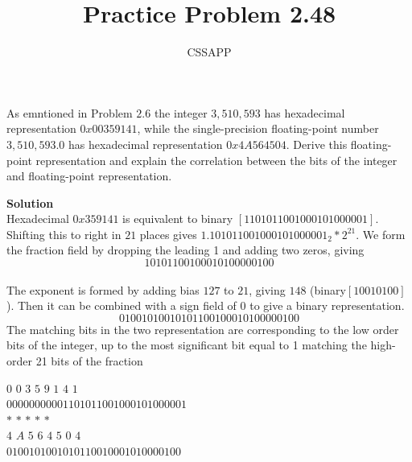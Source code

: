 \documentclass{article}
\title{Practice Problem 2.48}
\author{CSSAPP}
\begin{document}
    \maketitle
    \begin{flushleft}
        As emntioned in Problem $2.6$ the integer $3,510,593$ has hexadecimal representation 
        $0x00 359141$, while the single-precision floating-point number $3,510,593.0$ has 
        hexadecimal representation $0x4A564504$. Derive this floating-point representation
        and explain the correlation between the bits of the integer and floating-point representation.

        \bigskip
        \textbf{Solution}\\
        Hexadecimal $0x359141$ is equivalent to binary $[1101011001000101000001]$.
        Shifting this to right in $21$ places gives $1.101011001000101000001_2 \ast 2^{21}$. We form the 
        fraction field by dropping the leading 1 and adding two zeros, giving
        \[10101100100010100000100\] \\
        The exponent is formed by adding bias $127$ to $21$, giving $148$ (binary$[10010100]$). Then it 
        can be combined with a sign field of 0 to give a binary representation.
        \[01001010010101100100010100000100\]
        The matching bits in the two representation are corresponding to the low order bits of the integer, up to 
        the most significant bit equal to 1 matching the high-order 21 bits of the fraction

        $0$ $0$ $3$ $5$ $9$ $1$ $4$ $1$\\
        $00000000001101011001000101000001$\\
        $\ast$ $\ast$  $\ast$  $\ast$ $\ast$\\

        $4$ $A$ $5$ $6$ $4$ $5$ $0$ $4$\\
        $0100101001010110010001010000100$


    \end{flushleft}
\end{document}
